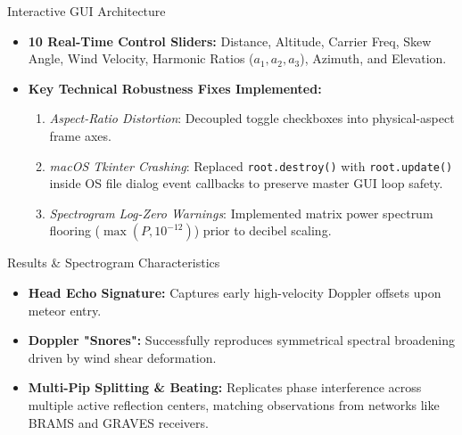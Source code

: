 \documentclass[aspectratio=169, 10pt]{beamer}
\begin{document}
\begin{frame}{Interactive GUI Architecture}
    \begin{itemize}
        \item \textbf{10 Real-Time Control Sliders:} Distance, Altitude, Carrier Freq, Skew Angle, Wind Velocity, Harmonic Ratios ($a_1, a_2, a_3$), Azimuth, and Elevation.
        \item \textbf{Key Technical Robustness Fixes Implemented:}
        \begin{enumerate}
            \item \textit{Aspect-Ratio Distortion}: Decoupled toggle checkboxes into physical-aspect frame axes.
            \item \textit{macOS Tkinter Crashing}: Replaced \texttt{root.destroy()} with \texttt{root.update()} inside OS file dialog event callbacks to preserve master GUI loop safety.
            \item \textit{Spectrogram Log-Zero Warnings}: Implemented matrix power spectrum flooring ($\max(P, 10^{-12})$) prior to decibel scaling.
        \end{enumerate}
    \end{itemize}
\end{frame}

\begin{frame}{Results \& Spectrogram Characteristics}
    \begin{itemize}
        \item \textbf{Head Echo Signature:} Captures early high-velocity Doppler offsets upon meteor entry.
        \item \textbf{Doppler "Snores":} Successfully reproduces symmetrical spectral broadening driven by wind shear deformation.
        \item \textbf{Multi-Pip Splitting \& Beating:} Replicates phase interference across multiple active reflection centers, matching observations from networks like BRAMS and GRAVES receivers.
    \end{itemize}
\end{frame}
\end{document}
